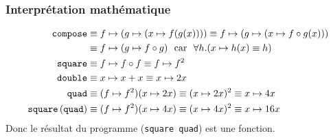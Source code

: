 %
\begin{frame}[containsverbatim]
\frametitle{Interprétation mathématique}
\label{maths}

{\small
\begin{alignat*}{1}
  \texttt{compose} &\equiv f \mapsto (g \mapsto (x \mapsto f(g(x))))
  \equiv f \mapsto (g \mapsto (x \mapsto f \circ g (x)))\\
&\equiv f \mapsto (g \mapsto f \circ g) \ \ \textnormal{car} \ \
  \forall h.(x \mapsto h(x) \equiv h)\\
  \texttt{square} &\equiv f \mapsto f \circ f \equiv f \mapsto f^2\\
  \texttt{double} &\equiv x \mapsto x + x \equiv x \mapsto 2x\\
  \texttt{quad}   &\equiv (f \mapsto f^2)(x \mapsto 2x) \equiv (x
  \mapsto 2x)^2 \equiv x \mapsto 4x\\
  \texttt{square} \, (\texttt{quad}) &\equiv (f \mapsto f^2)(x \mapsto
  4x) \equiv (x \mapsto 4x)^2 \equiv x \mapsto 16x
  \end{alignat*}
}
Donc le résultat du programme (\verb+square quad+) est une fonction.

\end{frame}

